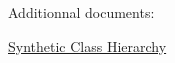 Additionnal documents\-:
\begin{DoxyItemize}
\item \hyperlink{group__grpSynthHierarchy}{Synthetic Class Hierarchy} 
\end{DoxyItemize}